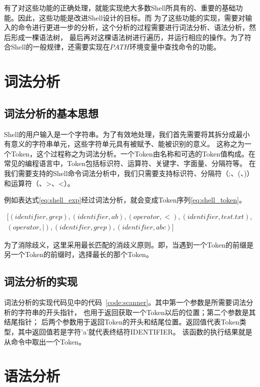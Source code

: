 \documentclass[a4paper,twoside]{article}
\begin{document}
\begin{spacing}{1.2}
有了对这些功能的正确处理，就能实现绝大多数Shell所具有的、重要的基础功能。因此，这些功能是改进Shell设计的目标。而
为了这些功能的实现，需要对输入的命令进行更进一步的分析，这个分析的过程需要进行词法分析、语法分析，然后形成一棵语法树，
最后再对这棵语法树进行遍历，并运行相应的操作。为了符合Shell的一般规律，还需要实现在$PATH$环境变量中查找命令的功能。

\section{词法分析}

\subsection{词法分析的基本思想}

Shell的用户输入是一个字符串。为了有效地处理，我们首先需要将其拆分成最小有意义的字符串单元，这些字符单元具有被赋予、能被识别的意义。
这称之为一个Token，这个过程称之为词法分析\cite{aho2007compilers}。一个Token由名称和可选的Token值构成。在常见的编程语言中，Token包括标识符、运算符、关键字、字面量、分隔符等。
在我们需要支持的Shell命令词法分析中，我们只需要支持标识符、分隔符（;、(、)）和运算符（\textbar、\textgreater、\textless）。

例如表达式\eqref{eq:shell_exp}经过词法分析，就会变成Token序列\eqref{eq:shell_token}。

\begin{multline}
	\label{eq:shell_token}
	[ (identifier,grep),(identifier,ab),(operator,<),(identifier,test.txt), \\ (operator,|),(identifier,grep),(identifier,abc) ]
\end{multline}

为了消除歧义，这里采用最长匹配的消歧义原则。即，当遇到一个Token的前缀是另一个Token的前缀时，选择最长的那个Token。

\subsection{词法分析的实现}

词法分析的实现代码见中的代码~\ref{code:scanner}。其中第一个参数是所需要词法分析的字符串的开头指针，
也用于返回获取一个Token以后的位置；第二个参数是其结尾指针；
后两个参数用于返回Token的开头和结尾位置。返回值代表Token类型，其中返回值若是字符'a'就代表终结符IDENTIFIER。
该函数的执行结果就是从命令中取出一个Token。


\section{语法分析}


\end{spacing}
\end{document}
